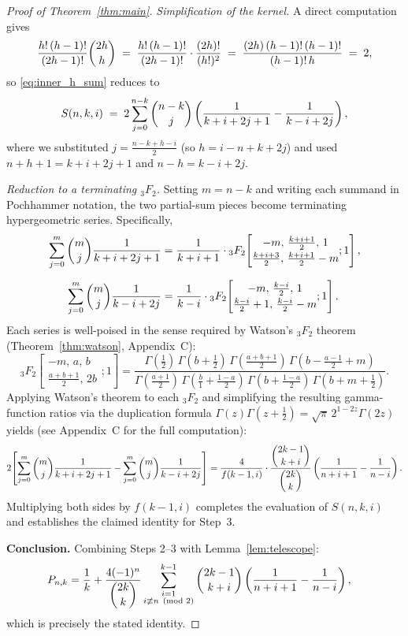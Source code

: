 \documentclass[12pt,a4paper]{article}
\theoremstyle{definition}
\renewcommand{\binom}[2]{\dbinom{#1}{#2}}
\begin{document}
\begin{proof}[Proof of Theorem~\ref{thm:main}]
\medskip
\noindent\textit{Simplification of the kernel.}
A direct computation gives
\[
\frac{h!\,(h-1)!}{(2h-1)!}\binom{2h}{h}
\;=\;
\frac{h!\,(h-1)!}{(2h-1)!}\cdot\frac{(2h)!}{(h!)^2}
\;=\;
\frac{(2h)\,(h-1)!\,(h-1)!}{(h-1)!\,h}
\;=\;2,
\]
so \eqref{eq:inner_h_sum} reduces to
\[
S(n,k,i)
\;=\;
2\sum_{j=0}^{n-k}
\binom{n-k}{j}
\left(\frac{1}{k+i+2j+1}-\frac{1}{k-i+2j}\right),
\]
where we substituted $j=\tfrac{n-k+h-i}{2}$ (so $h = i-n+k+2j$)
and used $n+h+1 = k+i+2j+1$ and $n-h = k-i+2j$.

\medskip
\noindent\textit{Reduction to a terminating ${}_3F_2$.}
Setting $m=n-k$ and writing each summand in Pochhammer notation, the
two partial-sum pieces become terminating hypergeometric series.
Specifically,
\begin{align*}
\sum_{j=0}^{m}\binom{m}{j}\frac{1}{k+i+2j+1}
&= \frac{1}{k+i+1}
  \cdot{}_3F_2\!\left[\begin{matrix}-m,\,\tfrac{k+i+1}{2},\,1\\[2pt]
                    \tfrac{k+i+3}{2},\,\tfrac{k+i+1}{2}-m\end{matrix};1\right],\\[6pt]
\sum_{j=0}^{m}\binom{m}{j}\frac{1}{k-i+2j}
&= \frac{1}{k-i}
  \cdot{}_3F_2\!\left[\begin{matrix}-m,\,\tfrac{k-i}{2},\,1\\[2pt]
                    \tfrac{k-i}{2}+1,\,\tfrac{k-i}{2}-m\end{matrix};1\right].
\end{align*}
Each series is well-poised in the sense required by Watson's
${}_{3}F_2$ theorem (Theorem~\ref{thm:watson}, Appendix~C):
\[
{}_3F_2\!\left[\begin{matrix}-m,\,a,\,b\\[2pt]
              \tfrac{a+b+1}{2},\,2b\end{matrix};1\right]
=
\frac{\Gamma(\tfrac{1}{2})\,\Gamma(b+\tfrac{1}{2})\,
      \Gamma(\tfrac{a+b+1}{2})\,
      \Gamma(b-\tfrac{a-1}{2}+m)}
     {\Gamma(\tfrac{a+1}{2})\,\Gamma(\tfrac{b}{1}+\tfrac{1-a}{2})\,
      \Gamma(b+\tfrac{1-a}{2})\,\Gamma(b+m+\tfrac{1}{2})}.
\]
Applying Watson's theorem to each ${}_3F_2$ and simplifying the
resulting gamma-function ratios via the duplication formula
$\Gamma(z)\Gamma(z+\tfrac{1}{2})=\sqrt{\pi}\,2^{1-2z}\Gamma(2z)$
yields (see Appendix~C for the full computation):
\[
2\!\left[\sum_{j=0}^{m}\binom{m}{j}\frac{1}{k+i+2j+1}
        -\sum_{j=0}^{m}\binom{m}{j}\frac{1}{k-i+2j}\right]
=
\frac{4}{f(k-1,i)}\cdot\frac{\binom{2k-1}{k+i}}{\binom{2k}{k}}
\left(\frac{1}{n+i+1}-\frac{1}{n-i}\right).
\]
Multiplying both sides by $f(k-1,i)$ completes the evaluation of
$S(n,k,i)$ and establishes the claimed identity for Step~3.

\textbf{Conclusion.}
Combining Steps 2--3 with Lemma~\ref{lem:telescope}:
\begin{align*}
P_{n,k}
&= \frac{1}{k}
  +
  \frac{4(-1)^n}{\binom{2k}{k}}
  \sum_{\substack{i=1\\i\not\equiv n\pmod{2}}}^{k-1}
  \binom{2k-1}{k+i}
  \left(\frac{1}{n+i+1}-\frac{1}{n-i}\right),
\end{align*}
which is precisely the stated identity.
\end{proof}
\end{document}
